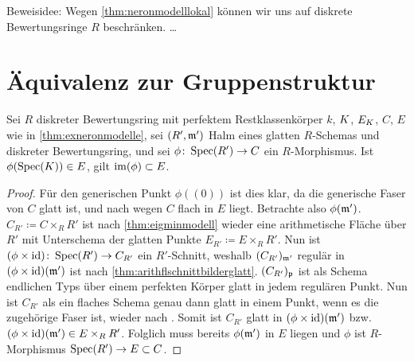 \documentclass[german]{scrreprt}
\begin{document}
\begin{Satz}
\end{Satz}
Beweisidee: Wegen \ref{thm:neronmodelllokal} können wir uns auf
diskrete Bewertungsringe $R$ beschränken.
…

\section{Äquivalenz zur Gruppenstruktur}

\begin{Lemma}\label{thm:schnittearithmflglatt}
  Sei $R$ diskreter Bewertungsring mit perfektem Restklassenkörper
  $k$, $K$, $E_{K}$, $C$, $E$ wie in \ref{thm:exneronmodelle},
  sei $(R',\mathfrak{m}')$ Halm eines glatten $R$-Schemas und diskreter
  Bewertungsring,
  und sei $\phi\colon \operatorname{Spec}(R')\to C$ ein $R$-Morphismus.
  Ist $\phi(\operatorname{Spec}(K))\in E$, gilt $\operatorname{im}(\phi)\subset E$.
  \begin{proof}
    Für den generischen Punkt $\phi((0))$ ist dies klar, da die
    generische Faser von $C$ glatt ist, und nach
    \cite[8.5, Proposition 17]{bosch} wegen $C$ flach in $E$ liegt.
    Betrachte also $\phi(\mathfrak{m}')$.
    $C_{R'}\coloneqq C\times_R R'$ ist nach
    \ref{thm:eigminmodell} wieder eine arithmetische Fläche über
    $R'$ mit Unterschema der glatten Punkte
    $E_{R'}\coloneqq E\times_R R'$.
    Nun ist $(\phi\times\mathrm{id})\colon\operatorname{Spec}(R')\to C_{R'}$ ein
    $R'$-Schnitt, weshalb $(C_{R'})_{\mathfrak{m}'}$ regulär in
    $(\phi\times\mathrm{id})(\mathfrak{m}')$ ist nach
    \ref{thm:arithflschnittbilderglatt}.
    $(C_{R'})_{\mathfrak{p}}$ ist als Schema endlichen Typs über einem
    perfekten Körper glatt in jedem regulären Punkt.
    Nun ist $C_{R'}$ als ein flaches Schema genau dann glatt in
    einem Punkt, wenn es die zugehörige Faser ist, wieder nach
    \cite[8.5, Proposition 17]{bosch}.
    Somit ist $C_{R'}$ glatt in $(\phi\times\mathrm{id})(\mathfrak{m}')$ bzw.
    $(\phi\times\mathrm{id})(\mathfrak{m}')\in E\times_R R'$. Folglich muss bereits
    $\phi(\mathfrak{m}')$ in $E$ liegen und $\phi$ ist $R$-Morphismus
    $\operatorname{Spec}(R')\to E\subset C$.
  \end{proof}
\end{Lemma}  
\end{document}
